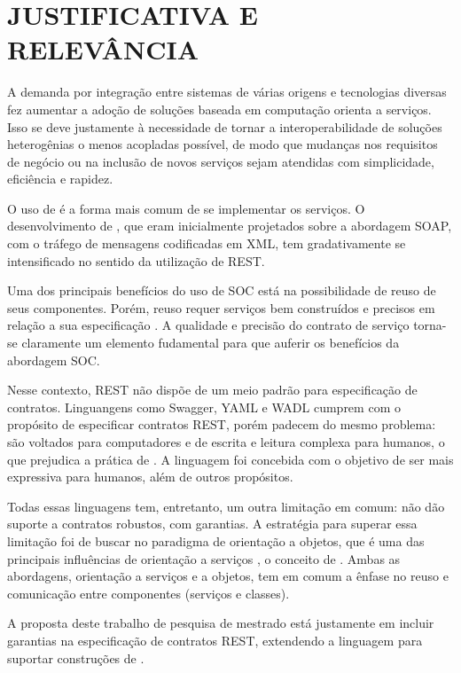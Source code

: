 \section{JUSTIFICATIVA E RELEVÂNCIA}
\vspace{-6mm}

A demanda por integração entre sistemas de várias origens e tecnologias diversas
fez aumentar a adoção de soluções baseada em computação orienta a serviços. Isso
se deve justamente à necessidade de tornar a interoperabilidade de soluções
heterogênias o menos acopladas possível, de modo que mudanças nos requisitos de negócio ou
na inclusão de novos serviços sejam atendidas com simplicidade,
eficiência e rapidez.

O uso de \ws{} é a forma mais comum de se implementar os serviços. O
desenvolvimento de \ws{}, que eram inicialmente projetados sobre a abordagem
SOAP, com o tráfego de mensagens codificadas em XML, tem gradativamente se
intensificado no sentido da utilização de REST.

Uma dos principais benefícios do uso de SOC está na possibilidade de reuso de
seus componentes. Porém, reuso requer serviços bem construídos e precisos em
relação a sua especificação \cite{jazequel1997design}. A qualidade e precisão do
contrato de serviço torna-se claramente um elemento fudamental para que auferir
os benefícios da abordagem SOC.

Nesse contexto, REST não dispõe de um meio padrão para especificação de
contratos. Linguangens como Swagger, YAML e WADL cumprem com o propósito de
especificar contratos REST, porém padecem do mesmo problema: são voltados para
computadores e de escrita e leitura complexa para humanos, o que
prejudica a prática de \CtFirst{}. A linguagem \neoidl{} foi concebida com o objetivo de ser mais
expressiva para humanos, além de outros propósitos.

Todas essas linguagens tem, entretanto, um outra limitação em comum: não dão
suporte a contratos robustos, com garantias. A estratégia para superar essa
limitação foi de buscar no paradigma de orientação a objetos, que é uma das
principais influências de orientação a serviços \cite{erl2009web},
o conceito de \designbycontract{}. Ambas as abordagens, orientação a serviços e
a objetos, tem em comum a ênfase no reuso e comunicação entre componentes
(serviços e classes).

A proposta deste trabalho de
pesquisa de mestrado está justamente em incluir garantias na especificação de
contratos REST, extendendo a linguagem \neoidl{} para suportar construções de
\designbycontract{}.



